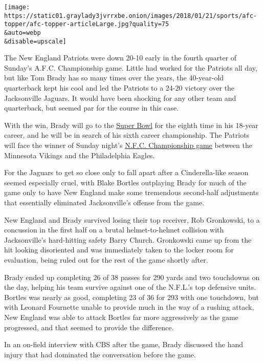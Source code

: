 \texttt{[image: https://static01.graylady3jvrrxbe.onion/images/2018/01/21/sports/afc-topper/afc-topper-articleLarge.jpg?quality=75\\\&auto=webp\\\&disable=upscale]}

The New England Patriots were down 20-10 early in the fourth quarter of
Sunday's A.F.C. Championship game. Little had worked for the Patriots
all day, but like Tom Brady has so many times over the years, the
40-year-old quarterback kept his cool and led the Patriots to a 24-20
victory over the Jacksonville Jaguars. It would have been shocking for
any other team and quarterback, but seemed par for the course in this
case.

With the win, Brady will go to the
\href{https://www.nytimes3xbfgragh.onion/2018/02/04/sports/super-bowl-patriots-eagles.html}{Super
Bowl} for the eighth time in his 18-year career, and he will be in
search of his sixth career championship. The Patriots will face the
winner of Sunday night's
\href{https://www.nytimes3xbfgragh.onion/2018/01/21/sports/nfc-championship-vikings-eagles.html}{N.F.C.
Championship game} between the Minnesota Vikings and the Philadelphia
Eagles.

For the Jaguars to get so close only to fall apart after a
Cinderella-like season seemed especially cruel, with Blake Bortles
outplaying Brady for much of the game only to have New England make some
tremendous second-half adjustments that essentially eliminated
Jacksonville's offense from the game.

New England and Brady survived losing their top receiver, Rob
Gronkowski, to a concussion in the first half on a brutal
helmet-to-helmet collision with Jacksonville's hard-hitting safety Barry
Church. Gronkowski came up from the hit looking disoriented and was
immediately taken to the locker room for evaluation, being ruled out for
the rest of the game shortly after.

Brady ended up completing 26 of 38 passes for 290 yards and two
touchdowns on the day, helping his team survive against one of the
N.F.L.'s top defensive units. Bortles was nearly as good, completing 23
of 36 for 293 with one touchdown, but with Leonard Fournette unable to
provide much in the way of a rushing attack, New England was able to
attack Bortles far more aggressively as the game progressed, and that
seemed to provide the difference.

In an on-field interview with CBS after the game, Brady discussed the
hand injury that had dominated the conversation before the game.

